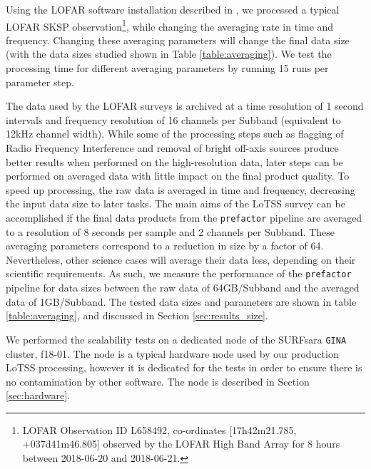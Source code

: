 Using the LOFAR software installation described in \cite{mechev17}, we processed a typical LOFAR SKSP observation\footnote{LOFAR Observation ID L658492, co-ordinates [17h42m21.785, +037d41m46.805] observed by the LOFAR High Band Array for 8 hours between 2018-06-20 and 2018-06-21.}, while changing the averaging rate  in time and frequency. Changing these averaging parameters will change the final data size (with the data sizes studied shown in Table \ref{table:averaging}). We test the processing time for different averaging parameters by running 15 runs per parameter step. 

The data used by the LOFAR surveys is archived at a time resolution of 1 second intervals and frequency resolution of 16 channels per Subband (equivalent to 12kHz channel width). While some of the processing steps such as flagging of Radio Frequency Interference and removal of bright off-axis sources produce better results when performed on the high-resolution data, later steps can be performed on averaged data with little impact on the final product quality. To speed up processing, the raw data is averaged in time and frequency, decreasing the input data size to later tasks. The main aims of the LoTSS survey can be accomplished if the final data products from the \texttt{prefactor} pipeline are averaged to a resolution of 8 seconds per sample and 2 channels per Subband. These averaging parameters correspond to a reduction in size by a factor of 64. Nevertheless, other science cases will average their data less, depending on their scientific requirements. As such, we measure the performance of the \texttt{prefactor} pipeline for data sizes between the raw data of 64GB/Subband and the averaged data of 1GB/Subband. The tested data sizes and parameters are shown in table \ref{table:averaging}, and discussed in Section \ref{sec:results_size}.

We performed the scalability tests on a dedicated node of the SURFsara \texttt{GINA} cluster, f18-01. The node is a typical hardware node used by our production LoTSS processing, however it is dedicated for the tests in order to ensure there is no contamination by other software. The node is described in Section \ref{sec:hardware}. 
     

